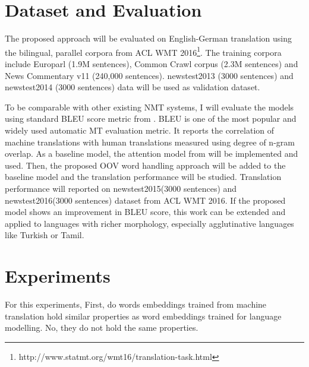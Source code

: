 \section{Dataset and Evaluation}
The proposed approach will be evaluated on English-German translation using the bilingual, parallel corpora from ACL WMT 2016\footnote{http://www.statmt.org/wmt16/translation-task.html}. The training corpora include Europarl (1.9M sentences), Common Crawl corpus (2.3M sentences) and News Commentary v11 (240,000 sentences). newstest2013 (3000 sentences) and newstest2014 (3000 sentences) data will be used as validation dataset.

To be comparable with other existing NMT systems, I will evaluate the models using standard BLEU score metric from  \cite{papineni2002bleu}. BLEU is one of the most popular and widely used automatic MT evaluation metric. It reports the correlation of machine translations with human translations measured using degree of n-gram overlap. As a baseline model, the attention model from \cite{bahdanau2014neural} will be implemented and used. Then, the proposed OOV word handling approach will be added to the baseline model and the translation performance will be studied. Translation performance will reported on newstest2015(3000 sentences) and newstest2016(3000 sentences) dataset from ACL WMT 2016. If the proposed model shows an improvement in BLEU score, this work can be extended and applied to languages with richer morphology, especially agglutinative languages like Turkish or Tamil.


\section{Experiments}
For this experiments, 
First, do words embeddings trained from machine translation hold similar properties as word embeddings trained for language modelling.
No, they do not hold the same properties.


